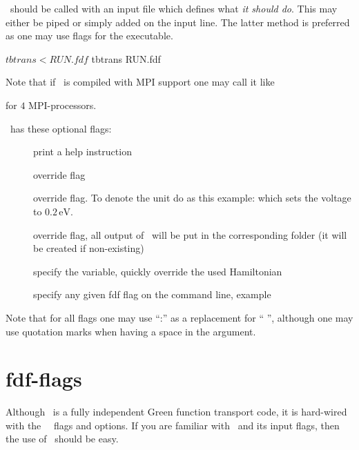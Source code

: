 \tbtrans\ should be called with an input file which defines what
\emph{it should do}. This may either be piped or simply added on the
input line. The latter method is preferred as one may use flags for
the executable.
\begin{shellexample}
  $ tbtrans < RUN.fdf
  $ tbtrans RUN.fdf
\end{shellexample}
Note that if \tbtrans\ is compiled with MPI support one may call it
like 
for $4$ MPI-processors.

\tbtrans\ has these optional flags:
\begin{description}
  \item[] print a help instruction

  \item[] override  flag

  \item[] override  flag. To denote the
  unit do as this example:  which sets the voltage to $0.2\,$.

  \item[] override  flag, all output
  of \tbtrans\ will be put in the corresponding folder (it will be
  created if non-existing)

  \item[] specify the  variable, quickly
  override the used Hamiltonian

  \item[] specify any given fdf flag on the command line,
  example 

\end{description}
Note that for all flags one may use ``:'' as a replacement for `` '',
although one may use quotation marks when having a space in the argument.



\section{fdf-flags}


Although \tbtrans\ is a fully independent Green function transport
code, it is hard-wired with the \tsiesta\ \fdflib\ flags and
options. If you are familiar with \tsiesta\ and its input flags, then
the use of \tbtrans\ should be easy.

